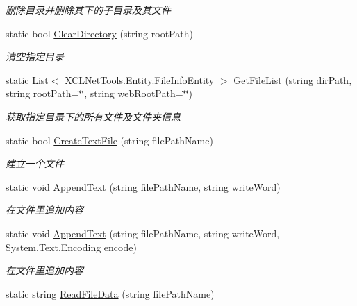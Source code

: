 \begin{DoxyCompactItemize}
\begin{DoxyCompactList}\small\item\em 删除目录并删除其下的子目录及其文件 \end{DoxyCompactList}\item 
static bool \hyperlink{class_x_c_l_net_tools_1_1_file_handler_1_1_file_directory_a1f64c69d3e2dc580b54a93fe0c871178}{Clear\+Directory} (string root\+Path)
\begin{DoxyCompactList}\small\item\em 清空指定目录 \end{DoxyCompactList}\item 
static List$<$ \hyperlink{class_x_c_l_net_tools_1_1_entity_1_1_file_info_entity}{X\+C\+L\+Net\+Tools.\+Entity.\+File\+Info\+Entity} $>$ \hyperlink{class_x_c_l_net_tools_1_1_file_handler_1_1_file_directory_ac145cab935d17a93ec683d1763bfdccd}{Get\+File\+List} (string dir\+Path, string root\+Path=\char`\"{}\char`\"{}, string web\+Root\+Path=\char`\"{}\char`\"{})
\begin{DoxyCompactList}\small\item\em 获取指定目录下的所有文件及文件夹信息 \end{DoxyCompactList}\item 
static bool \hyperlink{class_x_c_l_net_tools_1_1_file_handler_1_1_file_directory_a40110c2de9ef47ac099acdbbf0703a0c}{Create\+Text\+File} (string file\+Path\+Name)
\begin{DoxyCompactList}\small\item\em 建立一个文件 \end{DoxyCompactList}\item 
static void \hyperlink{class_x_c_l_net_tools_1_1_file_handler_1_1_file_directory_a7153ad7012f2c7259a89cc1f44fa57e2}{Append\+Text} (string file\+Path\+Name, string write\+Word)
\begin{DoxyCompactList}\small\item\em 在文件里追加内容 \end{DoxyCompactList}\item 
static void \hyperlink{class_x_c_l_net_tools_1_1_file_handler_1_1_file_directory_a15ae657816572db98e886f45b2949f76}{Append\+Text} (string file\+Path\+Name, string write\+Word, System.\+Text.\+Encoding encode)
\begin{DoxyCompactList}\small\item\em 在文件里追加内容 \end{DoxyCompactList}\item 
static string \hyperlink{class_x_c_l_net_tools_1_1_file_handler_1_1_file_directory_a5658b6c4ee9c9d4035033e5eb5ac773b}{Read\+File\+Data} (string file\+Path\+Name)

\end{DoxyCompactItemize}
